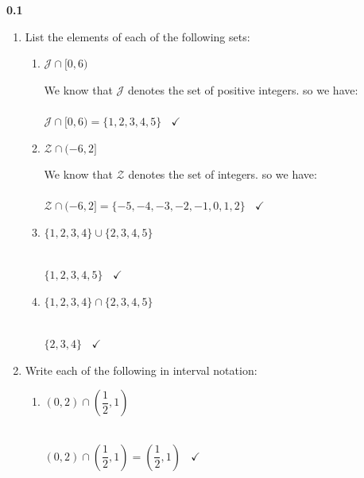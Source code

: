 \documentclass[fleqn]{article}
\begin{document}
  \textbf{0.1}
  \begin{enumerate}
    \item List the elements of each of the following sets:
    \begin{enumerate}
      \item $\mathcal{J} \cap [0,6)$

        \textcolor{hwColor}{
          We know that $\mathcal{J}$ denotes the set of positive integers. so we have:
          \\
          \\
          $
            \mathcal{J} \cap [0,6)=\{1, 2, 3, 4, 5\} ~~~~ \checkmark
          $
          \\
        }

      \item $\mathcal{Z} \cap (-6, 2]$

        \textcolor{hwColor}{
          We know that $\mathcal{Z}$ denotes the set of integers. so we have:
          \\
          \\
          $
            \mathcal{Z} \cap (-6, 2]=\{-5, -4, -3, -2, -1, 0, 1, 2\} ~~~~ \checkmark
          $
          \\
        }

      \item $\{1, 2, 3, 4 \}  \cup \{2, 3, 4, 5\}$

        \textcolor{hwColor}{
          \\
          $
            \{1, 2, 3, 4, 5\} ~~~~ \checkmark
          $
          \\
        }

      \item $\{1, 2, 3, 4\}  \cap \{2, 3, 4, 5\}$

        \textcolor{hwColor}{
          \\
          $
            \{2, 3, 4\} ~~~~ \checkmark
          $
          \\
        }

    \end{enumerate}

    \item Write each of the following in interval notation:
    \begin{enumerate}
      \item $(0, 2) \cap (\dfrac{1}{2}, 1)$

        \textcolor{hwColor}{
          \\
          $
            (0, 2) \cap (\dfrac{1}{2}, 1)=\left(\dfrac{1}{2}, 1\right) ~~~~ \checkmark
          $
          \\
        }


\end{enumerate}
\end{enumerate}
\end{document}
